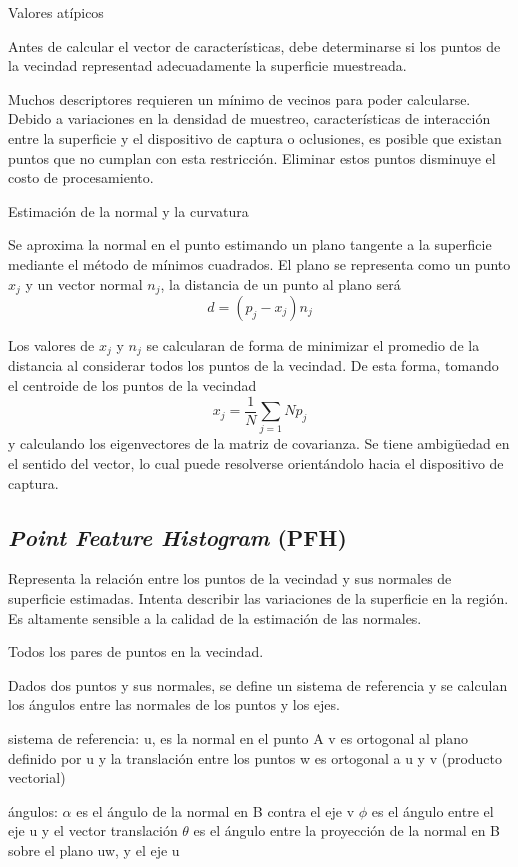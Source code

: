 Valores atípicos

Antes de calcular el vector de características, debe determinarse si los puntos
de la vecindad representad adecuadamente la superficie muestreada.

Muchos descriptores requieren un mínimo de vecinos para poder calcularse.
Debido a variaciones en la densidad de muestreo, características de interacción
entre la superficie y el dispositivo de captura o oclusiones, es posible que
existan puntos que no cumplan con esta restricción.
Eliminar estos puntos disminuye el costo de procesamiento.


Estimación de la normal y la curvatura

Se aproxima la normal en el punto estimando un plano tangente a la superficie
mediante el método de mínimos cuadrados.
El plano se representa como un punto $x_j$ y un vector normal $n_j$, la distancia de un punto
al plano será
\[ d = (p_j - x_j) n_j \]

Los valores de $x_j$ y $n_j$ se calcularan de forma de minimizar el promedio de la distancia al considerar todos los puntos de la vecindad.
De esta forma, tomando el centroide de los puntos de la vecindad
\[x_j = \frac{1}{N}\sum_{j=1}{N} p_j\]
y calculando los eigenvectores de la matriz de covarianza.
Se tiene ambigüedad en el sentido del vector, lo cual puede resolverse orientándolo hacia el dispositivo de captura.

\subsection{\emph{Point Feature Histogram} (PFH)}
Representa la relación entre los puntos de la vecindad y sus normales de superficie estimadas.
Intenta describir las variaciones de la superficie en la región.
Es altamente sensible a la calidad de la estimación de las normales.

Todos los pares de puntos en la vecindad.

Dados dos puntos y sus normales, se define un sistema de referencia
y se calculan los ángulos entre las normales de los puntos y los ejes.

sistema de referencia:
u, es la normal en el punto A
v es ortogonal al plano definido por u y la translación entre los puntos
w es ortogonal a u y v (producto vectorial)

ángulos:
$\alpha$ es el ángulo de la normal en B contra el eje v
$\phi$ es el ángulo entre el eje u y el vector translación
$\theta$ es el ángulo entre la proyección de la normal en B sobre el plano uw, y el eje u

